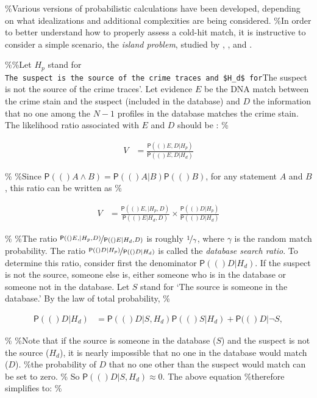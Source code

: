 \documentclass[10pt,dvipsnames,enabledeprecatedfontcommands]{scrartcl}
\newcommand{\pr}[1]{\mathsf{P}(#1)}
\begin{document}
\%Various versions of probabilistic calculations have been developed,
depending on what idealizations and additional complexities are being
considered. \%In order to better understand how to properly assess a
cold-hit match, it is instructive to consider a simple scenario, the
\emph{island problem}, studied by \citet{eggleston1978evidence},
\citet{dawid1994island}, and
\citet{dawid1996CoherentAnalysisForensic}.

\%\%Let \(H_p\) stand for
\texttt{The\ suspect\ is\ the\ source\ of\ the\ crime\ traces\textquotesingle{}\ and\ \$H\_d\$\ for}The
suspect is not the source of the crime traces'. Let evidence \(E\) be
the DNA match between the crime stain and the suspect (included in the
database) and \(D\) the information that no one among the \(N-1\)
profiles in the database matches the crime stain. The likelihood ratio
associated with \(E\) and \(D\) should be
\citep{balding1996EvaluatingDNAProfilea, taroni2006bayesian}: \%

\begin{align*}
V & = \frac{\pr(E,D\vert H_p)}{\pr(E,D\vert H_d)}
\end{align*}

\% \%Since \(\pr(A\wedge B)=\pr(A\vert B)\pr(B)\), for any statement
\(A\) and \(B\), this ratio can be written as \%

\begin{align*}
V & = \frac{\pr(E,\vert H_p,D)}{\pr(E\vert H_d,D)} \times \frac{\pr(D\vert H_p)}{\pr(D\vert H_d)}
\end{align*}

\% \%The ratio \(\nicefrac{\pr(E,\vert H_p,D)}{\pr(E\vert H_d,D)}\) is
roughly \(\nicefrac{1}{\gamma}\), where \(\gamma\) is the random match
probability. The ratio \(\nicefrac{\pr(D\vert H_p)}{\pr(D\vert H_d)}\)
is called the \emph{database search ratio}. To determine this ratio,
consider first the denominator \(\pr(D \vert H_d)\). If the suspect is
not the source, someone else is, either someone who is in the database
or someone not in the database. Let \(S\) stand for `The source is
someone in the database.' By the law of total probability, \%

\begin{align*}
\pr(D\vert H_d) & = \pr(D\vert S, H_d) \pr(S\vert H_d) + \pr(D\vert \neg S, %
\end{align*}

\% \%Note that if the source is someone in the database (\(S\)) and the
suspect is not the source (\(H_d\)), it is nearly impossible that no one
in the database would match (\(D\)). \%the probability of \(D\) that no
one other than the suspect would match can be set to zero.
\% So
\(\pr(D\vert S, H_d)\approx 0\). The above equation \%therefore
simplifies to: \%
\end{document}
